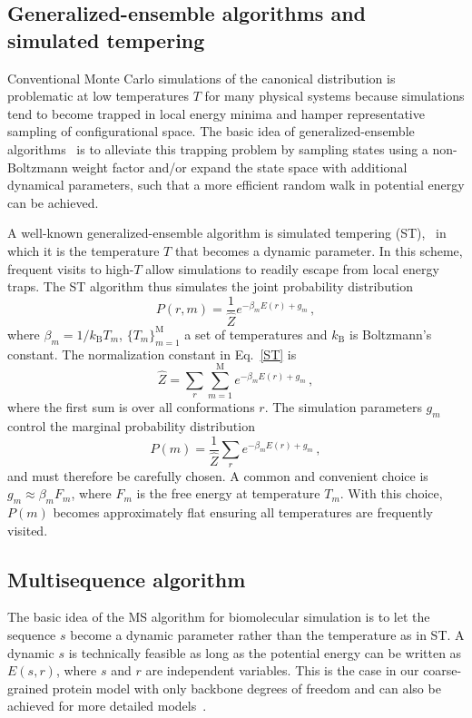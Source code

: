 \documentclass[
aip,
rsi,%
amsmath,amssymb,
reprint,%
]{revtex4-1}
\newcommand	 {\sbar}	{{s}}
\newcommand	 {\rbar}	{{r}}
\begin{document}
\subsection{Generalized-ensemble algorithms and simulated tempering}
\noindent
Conventional Monte Carlo simulations of the canonical distribution is problematic at low temperatures $T$ for many physical systems because simulations tend to become trapped in local energy minima and hamper representative sampling of configurational space. The basic idea of generalized-ensemble algorithms~\cite{Mitsutake2001} is to alleviate this trapping problem by sampling states using a non-Boltzmann weight factor and/or expand the state space with additional dynamical parameters, such that a more efficient random walk in potential energy can be achieved. 

A well-known generalized-ensemble algorithm is simulated tempering (ST),~\cite{Marinari1992,Lyubartsev1992} in which it is the temperature $T$ that becomes a dynamic parameter. In this scheme, frequent visits to high-$T$ allow simulations to readily escape from local energy traps. The ST algorithm thus simulates the joint probability distribution 
\begin{equation}
P(\rbar,m) =\dfrac{1}{\hat{Z}} e^{-\beta_m E(\rbar) + g_m}\,,
\label{ST}
\end{equation}
where  $\beta_m=1/k_\mathrm{B} T_m$, $\{T_m\}_{m=1}^\mathrm{M}$ a set of temperatures and $k_\mathrm{B}$ is Boltzmann's constant. The normalization constant in Eq.~\ref{ST} is  
\begin{equation}
\hat{Z} = \sum_r \sum_{m=1}^{\mathrm{M}}e^{-\beta_m E(\rbar) + g_m}\,,
\end{equation}
where the first sum is over all conformations $\rbar$. The simulation parameters $g_m$ control the marginal probability distribution
\begin{equation}
P(m) = \frac{1}{\hat{Z}}\sum_r e^{-\beta_m E(\rbar) + g_m} \,,
\end{equation}
and must therefore be carefully chosen. A common and convenient choice is $g_m\approx \beta_m F_m$, where $F_m$ is the free energy at temperature $T_m$. With this choice, $P(m)$ becomes approximately flat ensuring all temperatures are frequently visited. 

\subsection{Multisequence algorithm}
\noindent 
The basic idea of the MS algorithm for biomolecular simulation is to let the sequence $\sbar$ become a dynamic parameter rather than the temperature as in ST. A dynamic $\sbar$ is technically feasible as long as the potential energy can be written as $E(\sbar,\rbar)$, where $\sbar$ and $\rbar$ are independent variables. This is the case in our coarse-grained protein model with only backbone degrees of freedom and can also be achieved for more detailed  models~\cite{Bhattacherjee2013,Wallin2017}. 
\end{document}
